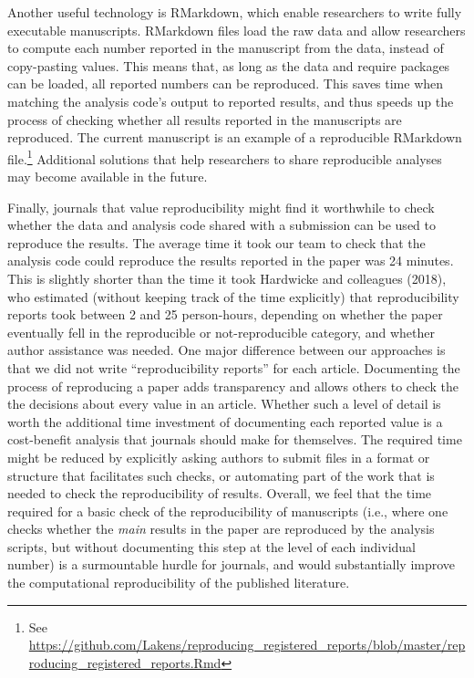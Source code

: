 \documentclass[,jou, a4paper,floatsintext]{apa6}
\let\rmarkdownfootnote\footnote%
\def\footnote{\protect\rmarkdownfootnote}
\begin{document}
Another useful technology is RMarkdown, which enable researchers to write fully executable manuscripts. RMarkdown files load the raw data and allow researchers to compute each number reported in the manuscript from the data, instead of copy-pasting values. This means that, as long as the data and require packages can be loaded, all reported numbers can be reproduced. This saves time when matching the analysis code's output to reported results, and thus speeds up the process of checking whether all results reported in the manuscripts are reproduced. The current manuscript is an example of a reproducible RMarkdown file.\footnote{See \url{https://github.com/Lakens/reproducing_registered_reports/blob/master/reproducing_registered_reports.Rmd}} Additional solutions that help researchers to share reproducible analyses may become available in the future.

Finally, journals that value reproducibility might find it worthwhile to check whether the data and analysis code shared with a submission can be used to reproduce the results. The average time it took our team to check that the analysis code could reproduce the results reported in the paper was 24 minutes. This is slightly shorter than the time it took Hardwicke and colleagues (2018), who estimated (without keeping track of the time explicitly) that reproducibility reports took between 2 and 25 person-hours, depending on whether the paper eventually fell in the reproducible or not-reproducible category, and whether author assistance was needed. One major difference between our approaches is that we did not write \enquote{reproducibility reports} for each article. Documenting the process of reproducing a paper adds transparency and allows others to check the the decisions about every value in an article. Whether such a level of detail is worth the additional time investment of documenting each reported value is a cost-benefit analysis that journals should make for themselves. The required time might be reduced by explicitly asking authors to submit files in a format or structure that facilitates such checks, or automating part of the work that is needed to check the reproducibility of results. Overall, we feel that the time required for a basic check of the reproducibility of manuscripts (i.e., where one checks whether the \emph{main} results in the paper are reproduced by the analysis scripts, but without documenting this step at the level of each individual number) is a surmountable hurdle for journals, and would substantially improve the computational reproducibility of the published literature.
\end{document}
